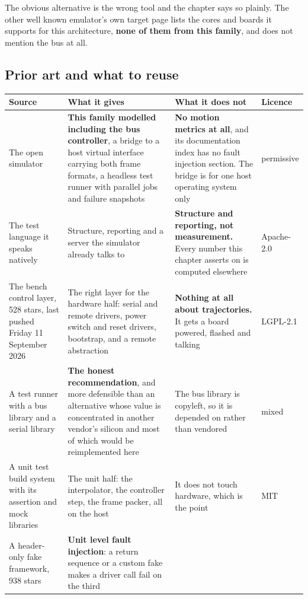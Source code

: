 The obvious alternative is the wrong tool and the chapter says so plainly. The
other well known emulator's own target page lists the cores and boards it
supports for this architecture, \textbf{none of them from this family}, and does
not mention the bus at all.

\subsection*{Prior art and what to reuse}

\begin{table}[H]\centering\small
\begin{tabular}{p{34mm}p{46mm}p{38mm}p{20mm}}
\toprule
Source & What it gives & What it does not & Licence \\
\midrule
The open simulator & \textbf{This family modelled including the bus controller},
a bridge to a host virtual interface carrying both frame formats, a headless test
runner with parallel jobs and failure snapshots & \textbf{No motion metrics at
all}, and its documentation index has no fault injection section. The bridge is
for one host operating system only & permissive \\
The test language it speaks natively & Structure, reporting and a server the
simulator already talks to & \textbf{Structure and reporting, not measurement.}
Every number this chapter asserts on is computed elsewhere & Apache-2.0 \\
The bench control layer, 528 stars, last pushed Friday 11 September 2026 & The
right layer for the hardware half: serial and remote drivers, power switch and
reset drivers, bootstrap, and a remote abstraction & \textbf{Nothing at all about
trajectories.} It gets a board powered, flashed and talking & LGPL-2.1 \\
A test runner with a bus library and a serial library & \textbf{The honest
recommendation}, and more defensible than an alternative whose value is
concentrated in another vendor's silicon and most of which would be
reimplemented here & The bus library is copyleft, so it is depended on rather
than vendored & mixed \\
A unit test build system with its assertion and mock libraries & The unit half:
the interpolator, the controller step, the frame packer, all on the host & It
does not touch hardware, which is the point & MIT \\
A header-only fake framework, 938 stars & \textbf{Unit level fault injection}: a
return sequence or a custom fake makes a driver call fail on the third

\end{tabular}
\end{table}
